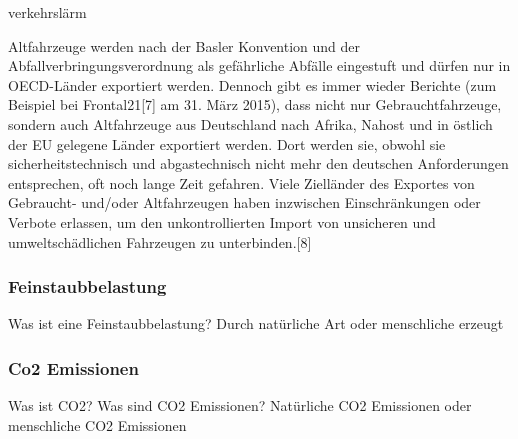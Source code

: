 verkehrslärm


Altfahrzeuge werden nach der Basler Konvention und der Abfallverbringungsverordnung als gefährliche Abfälle eingestuft und dürfen nur in OECD-Länder exportiert werden. Dennoch gibt es immer wieder Berichte (zum Beispiel bei Frontal21[7] am 31. März 2015), dass nicht nur Gebrauchtfahrzeuge, sondern auch Altfahrzeuge aus Deutschland nach Afrika, Nahost und in östlich der EU gelegene Länder exportiert werden. Dort werden sie, obwohl sie sicherheitstechnisch und abgastechnisch nicht mehr den deutschen Anforderungen entsprechen, oft noch lange Zeit gefahren. Viele Zielländer des Exportes von Gebraucht- und/oder Altfahrzeugen haben inzwischen Einschränkungen oder Verbote erlassen, um den unkontrollierten Import von unsicheren und umweltschädlichen Fahrzeugen zu unterbinden.[8]


\subsubsection{Feinstaubbelastung}
Was ist eine Feinstaubbelastung?
Durch natürliche Art oder menschliche erzeugt
\subsubsection{Co2 Emissionen}
Was ist \ac{CO2}?
Was sind \ac{CO2} Emissionen?
Natürliche \ac{CO2} Emissionen oder menschliche CO2 Emissionen
